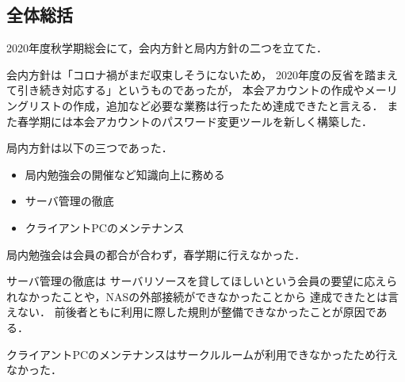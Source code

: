 \subsection*{全体総括}


2020年度秋学期総会にて，会内方針と局内方針の二つを立てた．

会内方針は「コロナ禍がまだ収束しそうにないため，
2020年度の反省を踏まえて引き続き対応する」というものであったが，
本会アカウントの作成やメーリングリストの作成，追加など必要な業務は行ったため達成できたと言える．
また春学期には本会アカウントのパスワード変更ツールを新しく構築した．

局内方針は以下の三つであった．
\begin{itemize}
  \item 局内勉強会の開催など知識向上に務める
  \item サーバ管理の徹底
  \item クライアントPCのメンテナンス
\end{itemize}
局内勉強会は会員の都合が合わず，春学期に行えなかった．

サーバ管理の徹底は
サーバリソースを貸してほしいという会員の要望に応えられなかったことや，NASの外部接続ができなかったことから
達成できたとは言えない．
前後者ともに利用に際した規則が整備できなかったことが原因である．

クライアントPCのメンテナンスはサークルルームが利用できなかったため行えなかった．
